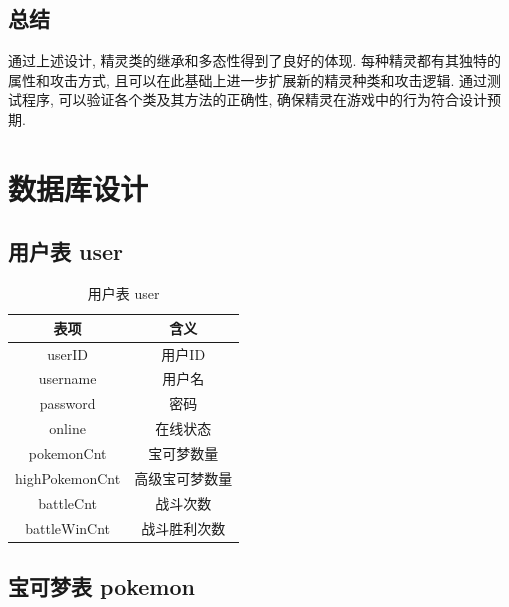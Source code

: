 \subsection{总结}

通过上述设计, 精灵类的继承和多态性得到了良好的体现. 每种精灵都有其独特的属性和攻击方式, 且可以在此基础上进一步扩展新的精灵种类和攻击逻辑. 通过测试程序, 可以验证各个类及其方法的正确性, 确保精灵在游戏中的行为符合设计预期.

\section{数据库设计}

\subsection{用户表 user}

\begin{longtable}[c]{|c|c|}
    \caption{用户表 user}           \\
    \hline
    \textbf{表项}    & \textbf{含义} \\ \hline
    \endfirsthead
    \endhead
    userID         & 用户ID        \\ \hline
    username       & 用户名         \\ \hline
    password       & 密码          \\ \hline
    online         & 在线状态        \\ \hline
    pokemonCnt     & 宝可梦数量       \\ \hline
    highPokemonCnt & 高级宝可梦数量     \\ \hline
    battleCnt      & 战斗次数        \\ \hline
    battleWinCnt   & 战斗胜利次数      \\ \hline
\end{longtable}

\subsection{宝可梦表 pokemon}

